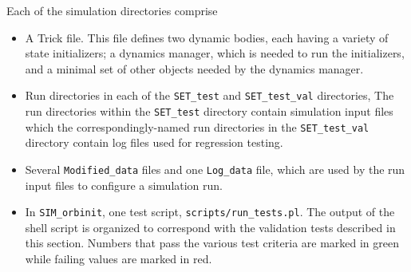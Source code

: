 Each of the simulation directories comprise
\begin{itemize}
\item A Trick \Sdefine file. This file defines
two dynamic bodies, each having a variety of state initializers;
a dynamics manager, which is needed to run the initializers,
and a minimal set of other objects needed by the dynamics manager.
\item Run directories in each of the {\tt SET\_test} and
{\tt SET\_test\_val} directories,
The run directories within the {\tt SET\_test} directory contain
simulation input files which the correspondingly-named run directories
in the {\tt SET\_test\_val} directory contain log files used for
regression testing.
\item Several {\tt Modified\_data} files and one {\tt Log\_data} file,
which are used by the run input files to configure a simulation run.
\item In {\tt SIM\_orbinit}, one test script, {\tt scripts/run\_tests.pl}.
The output of the shell script is organized to correspond with
the validation tests described in this section.
Numbers that pass the various test criteria are marked in green while
failing values are marked in red.
\end{itemize}

